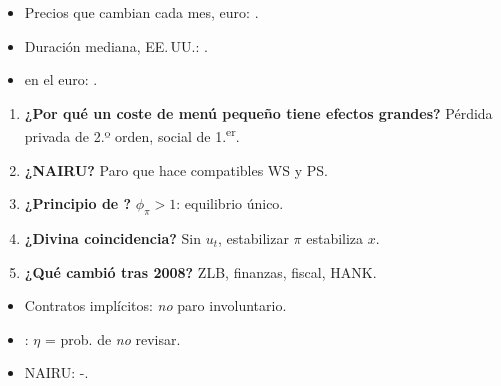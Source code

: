 \documentclass{article}
\begin{document}
\begin{columnas}
\anexorepaso
{}
\begin{itemize}
\item Precios que cambian cada mes, euro: .
\item Duración mediana, EE.\,UU.: .
\item {} en el euro: .
\end{itemize}
\begin{enumerate}
\item \textbf{¿Por qué un coste de menú pequeño tiene efectos grandes?} Pérdida privada de 2.º orden, social de 1.\textsuperscript{er}.
\item \textbf{¿NAIRU?} Paro que hace compatibles WS y PS.
\item \textbf{¿Principio de ?} $\phi_\pi>1$: equilibrio único.
\item \textbf{¿Divina coincidencia?} Sin $u_t$, estabilizar $\pi$ estabiliza $x$.
\item \textbf{¿Qué cambió tras 2008?} ZLB, finanzas, fiscal, HANK.
\end{enumerate}
\begin{trampa}
\begin{itemize}
\item Contratos implícitos: \emph{no} paro involuntario.
\item {}: $\eta$ = prob. de \emph{no} revisar.
\item NAIRU: -.
\end{itemize}
\end{trampa}

\end{columnas}
\end{document}
